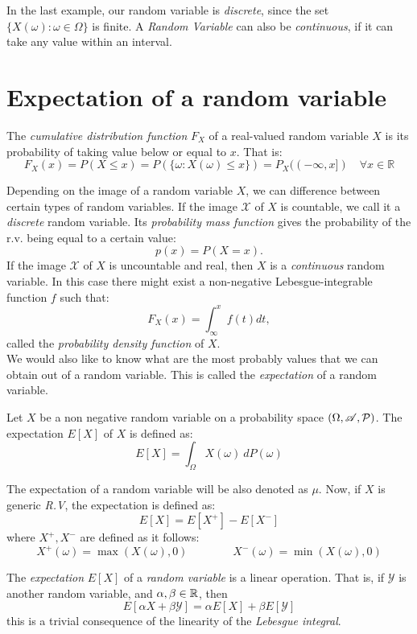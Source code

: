 In the last example, our random variable is \emph{discrete}, since the set $\{X(\omega): \omega \in \Omega\}$ is finite.
 A \emph{Random Variable} can also be \emph{continuous}, if it can take any value within an interval.\\


\section{Expectation of a random variable}

\begin{ndef}
The \emph{cumulative distribution function } $F_X$ of a real-valued random variable $X$ is its probability of taking value below or equal to $x$. That is:
$$
F_X(x) = P(X \leq x) = P(\{\omega : X(\omega) \leq x\}) = P_X((-\infty,x]) \quad \forall x \in \mathbb R
$$
\end{ndef}

Depending on the image of a random variable $X$, we can difference between certain types of random variables. If the image $\mathcal X$ of $X$ is countable, we call it a \emph{discrete} random variable. Its \emph{probability mass function} gives the
probability of the r.v. being equal to a certain value:
$$
p(x) = P(X = x).
$$
If the image $\mathcal X$ of $X$ is uncountable and real, then $X$ is a \emph{continuous} random variable. In this case there might exist a non-negative Lebesgue-integrable function $f$ such that:
$$
F_X(x) = \int_{\infty}^x f(t) dt,
$$
called the \emph{probability density function} of $X$.\\

We would also like to know what are the most probably values that we can obtain out of a random variable.  This is called the \emph{expectation} of a random variable.

\begin{ndef}
Let $X$ be a non negative random variable on a probability space $(\Omega,\mathscr{A},\mathcal{P})$. The expectation $E[X]$ of $X$ is defined as:
$$
E[X] = \int_\Omega X(\omega) \ dP(\omega)
$$
\end{ndef}
The expectation of a random variable will be also denoted as $\mu$. Now, if $X$ is generic \emph{R.V}, the expectation is defined as:
$$
E[X] = E[X^+] - E[X^-]
$$
where $X^+,X^-$ are defined as it follows:
$$
X^+(\omega) = \max(X(\omega),0) \quad \quad  \quad \quad X^-(\omega) = \min(X(\omega),0)
$$

The \emph{expectation} $E[X]$ of a \emph{random variable} is a linear operation. That is, if $\mathcal Y$ is another random variable, and $\alpha,\beta \in \mathbb{R}$, then
$$
E[\alpha X + \beta \mathcal Y] = \alpha E[X] + \beta E[\mathcal Y]
$$
this is a trivial consequence of the linearity of the \emph{Lebesgue integral}.


